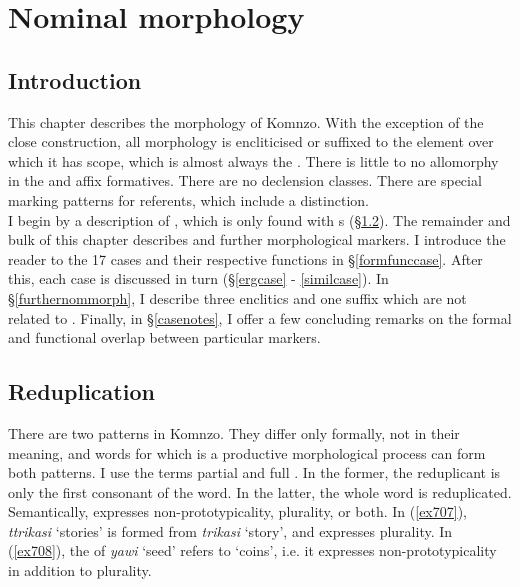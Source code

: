 \chapter{Nominal morphology}
\label{cha:nominals-chapter}

\section{Introduction} \label{nommorphintro}

This chapter describes the  morphology of Komnzo. With the exception of the close  construction, all  morphology is encliticised or suffixed to the element over which it has scope, which is almost always the . There is little to no allomorphy in the  and affix formatives. There are no declension classes. There are special marking patterns for  referents, which include a  distinction.\\

I begin by a description of , which is only found with s (\S{}\ref{nomreduplication}). The remainder and bulk of this chapter describes  and further morphological markers. I introduce the reader to the 17 cases and their respective functions in \S{}\ref{formfunccase}. After this, each case is discussed in turn (\S{}\ref{ergcase} - \ref{similcase}). In \S{}\ref{furthernommorph}, I describe three enclitics and one suffix which are not related to . Finally, in \S{}\ref{casenotes}, I offer a few concluding remarks on the formal and functional overlap between particular  markers.

\section{Reduplication}\label{nomreduplication}

There are two  patterns in Komnzo. They differ only formally, not in their meaning, and words for which  is a productive morphological process can form both patterns. I use the terms partial  and full . In the former, the reduplicant is only the first consonant of the word. In the latter, the whole word is reduplicated.\\

Semantically,  expresses non-prototypicality, plurality, or both. In (\ref{ex707}), \emph{ttrikasi} `stories' is formed from \emph{trikasi} `story', and  expresses plurality. In (\ref{ex708}), the  of \emph{yawi} `seed' refers to `coins', i.e. it expresses non-prototypicality in addition to plurality. 

